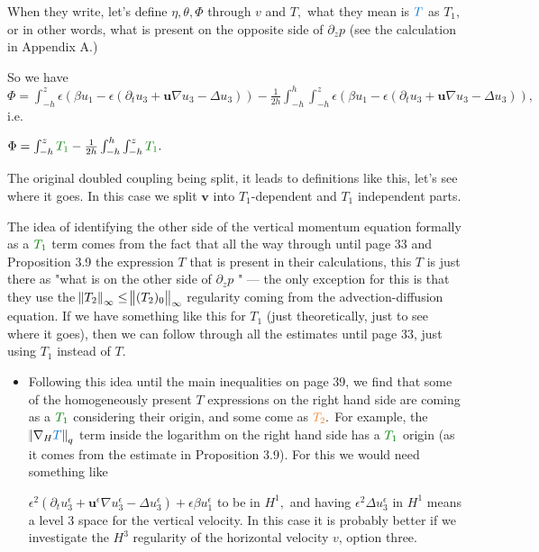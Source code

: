 \documentclass[11pt]{article}
\begin{document}
\begin{enumerate}
When they write, let's define $\eta, \theta, \Phi$ through $v$ and $T,$ what they mean is $\textcolor{trueblue}{T}$ as \textcolor{ao}{$T_1$}, or in other words, what is present on the opposite side of $\partial_z p$ (see the calculation in Appendix A.)

So we have $\Phi = \int_{-h}^z \epsilon (\beta u_1 - \epsilon (\partial_t u_3 + \mathbf{u} \nabla u_3 - \Delta u_3)) - \frac{1}{2h} \int_{-h}^h \int_{-h}^z \epsilon (\beta u_1 - \epsilon (\partial_t u_3 + \mathbf{u} \nabla u_3 - \Delta u_3)), $ i.e.

$\Phi = \int_{-h}^z  \textcolor{ao}{T_1} - \frac{1}{2h} \int_{-h}^h \int_{-h}^z \textcolor{ao}{T_1}.$

The original doubled coupling being split, it leads to definitions like this, let's see where it goes. In this case we split $\mathbf{v}$ into $T_1$-dependent and $T_1$ independent parts.

The idea of identifying the other side of the vertical momentum equation formally as a $\textcolor{ao}{T_1}$ term comes from the fact that all the way through until page 33 and Proposition 3.9 the expression $T$ that is present in their calculations, this $T$ is just there as "what is on the other side of $\partial_z p$ " --- the only exception for this is that they use the $\norm{T_2}_\infty \leq \norm{({T_2})_0}_\infty$ regularity coming from the advection-diffusion equation. If we have something like this for $T_1$ (just theoretically, just to see where it goes), then we can follow through all the estimates until page 33, just using $T_1$ instead of $T.$

\begin{itemize}

\item Following this idea until the main inequalities on page 39, we find that some of the homogeneously present $T$ expressions on the right hand side are coming as a $\textcolor{ao}{T_1}$ considering their origin, and some come as $\textcolor{cadmiumorange}{T_2}.$ For example, the $\norm{\nabla_H \textcolor{trueblue}{T}}_q$ term inside the logarithm on the right hand side has a $\textcolor{ao}{T_1}$ origin (as it comes from the estimate in Proposition 3.9). For this we would need something like

$\epsilon^2 (\partial_t u^\epsilon_3 + \mathbf{u}^\epsilon \nabla u^\epsilon_3 - \Delta u^\epsilon_3) + \epsilon \beta u^\epsilon_1$ to be in $H^1,$ and having $\epsilon^2 \Delta u^\epsilon_3$ in $H^1$ means a level 3 space for the vertical velocity. In this case it is probably better if we investigate the $H^3$ regularity of the horizontal velocity $v$, option three.


\end{itemize}
\end{enumerate}
\end{document}
